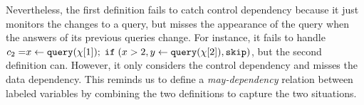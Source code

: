  {
 Nevertheless, the first definition fails to catch control dependency because it just monitors the changes to a query, but misses the appearance of the query when the answers of its previous queries change. For instance, it fails to handle $
       c_2 = \mathrel{ x \leftarrow {\tt query}(\chi[1]) } ; \;\mathtt{if}\;( x > 2 , \mathrel{ y \leftarrow {\tt query}(\chi[2]) }, \mathtt{skip} )
    $, but the second definition can. However, it only considers the control dependency and misses the data dependency. This reminds us to define a \emph{may-dependency} relation between labeled variables by combining the two definitions to capture the two situations.
       
 
   }
